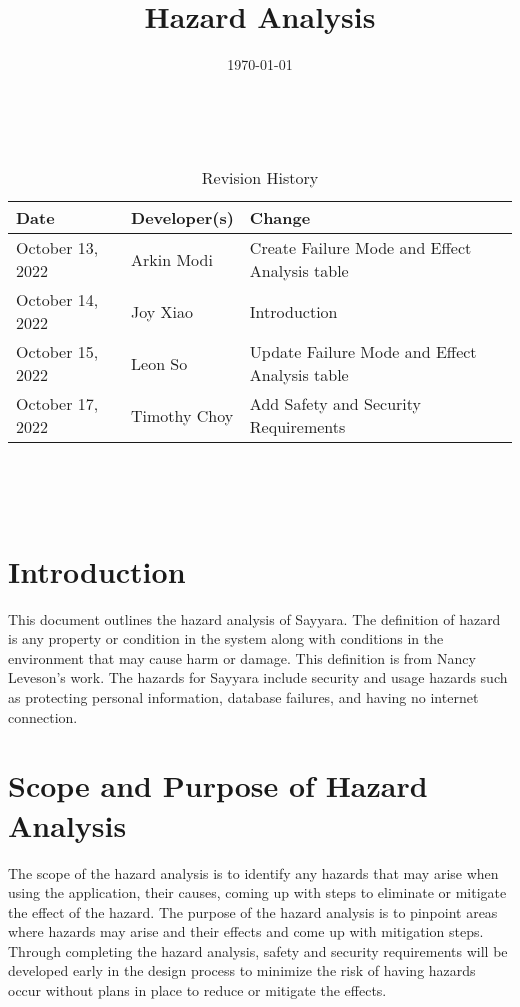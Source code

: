 \documentclass{article}
\title{Hazard Analysis\\\progname}
\author{\authname}
\date{\today}
\begin{document}
\maketitle
\thispagestyle{empty}

~\newpage


\begin{table}[hp]
	\caption{Revision History} \label{TblRevisionHistory}
	\begin{tabularx}{\textwidth}{llX}
		\toprule
		\textbf{Date}    & \textbf{Developer(s)} & \textbf{Change}                               \\
		\midrule
		October 13, 2022 & Arkin Modi            & Create Failure Mode and Effect Analysis table \\
		October 14, 2022 & Joy Xiao              & Introduction                                  \\
		October 15, 2022 & Leon So               & Update Failure Mode and Effect Analysis table \\
		October 17, 2022 & Timothy Choy          & Add Safety and Security Requirements          \\
		\bottomrule
	\end{tabularx}
\end{table}

~\newpage

\tableofcontents

~\newpage



\section{Introduction}
This document outlines the hazard analysis of Sayyara. The definition of hazard is any property or
condition in the system along with conditions in the environment that may cause harm or damage.
This definition is from Nancy Leveson's work. The hazards for Sayyara include security and usage
hazards such as protecting personal information, database failures, and having no internet
connection.

\section{Scope and Purpose of Hazard Analysis}
The scope of the hazard analysis is to identify any hazards that may arise when using the
application, their causes, coming up with steps to eliminate or mitigate the effect of the hazard.
The purpose of the hazard analysis is to pinpoint areas where hazards may arise and their effects
and come up with mitigation steps. Through completing the hazard analysis, safety and security
requirements will be developed early in the design process to minimize the risk of having hazards
occur without plans in place to reduce or mitigate the effects.
\end{document}
